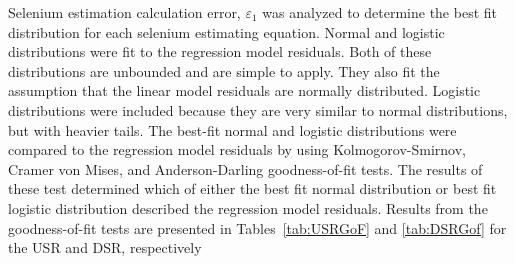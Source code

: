 Selenium estimation calculation error, $\varepsilon_{1}$ was analyzed to determine the best fit distribution for each selenium estimating equation.  Normal and logistic distributions were fit to the regression model residuals.  Both of these distributions are unbounded and are simple to apply.  They also fit the assumption that the linear model residuals are normally distributed.  Logistic distributions were included because they are very similar to normal distributions, but with heavier tails.  The best-fit normal and logistic distributions were compared to the regression model residuals by using Kolmogorov-Smirnov, Cramer von Mises, and Anderson-Darling goodness-of-fit tests.  The results of these test determined which of either the best fit normal distribution or best fit logistic distribution described the regression model residuals.  Results from the goodness-of-fit tests are presented in Tables~\ref{tab:USRGoF} and \ref{tab:DSRGof} for the USR and DSR, respectively


